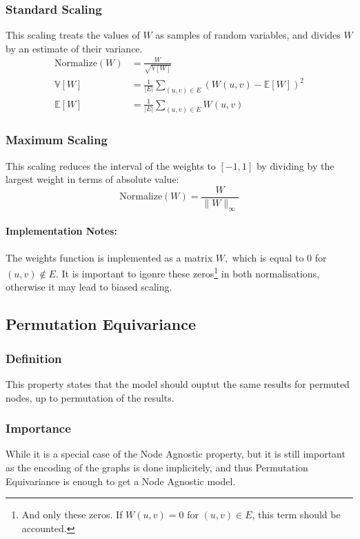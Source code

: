 \subsubsection{Standard Scaling}
This scaling treats the values of $W$ as samples of random variables, and divides $W$ by an estimate of their variance. 
\begin{align*}
	\text{Normalize}(W)&=\frac{W}{\sqrt{\mathbb{V}[W]}}\\
	\mathbb{V}[W]&=\frac{1}{\lvert E \rvert} \sum_{(u,v)\in E}(W(u,v)-\mathbb{E}[W])^2 \\
	\mathbb{E}[W]&=\frac{1}{\lvert E \rvert}\sum_{(u,v)\in E}W(u,v) 
\end{align*}



\subsubsection{Maximum Scaling}
This scaling reduces the interval of the weights to $[-1,1]$ by dividing by the largest weight in terms of absolute value:
$$
\text{Normalize}(W)=\frac{W}{\lVert W \rVert_{\infty}}
$$
\paragraph{Implementation Notes:}
The weights function is implemented as a matrix $W,$ which is equal to $0$ for $(u,v)\notin E.$ 
\newline It is important to igonre these zeros\footnote{And only these zeros. If $W(u,v)=0$ for $(u,v)\in E$, this term should be accounted.} in both normalisations, otherwise it may lead to biased scaling.

\subsection{Permutation Equivariance}
\subsubsection{Definition}
This property states that the model should ouptut the same results for permuted nodes, up to permutation of the results.
\subsubsection{Importance}
While it is a special case of the Node Agnostic property, but it is still important as the encoding of the graphs is done implicitely, and thus Permutation Equivariance is enough to get a Node Agnostic model.
